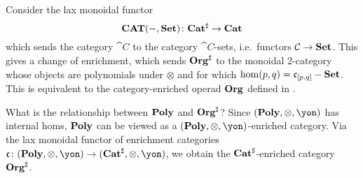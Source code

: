 Consider the lax monoidal functor
\[\mathbf{CAT}(-,\mathbf{Set}) \colon \mathbf{Cat}^\sharp \to \mathbf{Cat}\]
which sends the category $\cat{C}$ to the category $\cat{C}$-sets, i.e.\ functors $\mathcal{C}\to\mathbf{Set}$. This gives a change of enrichment, which sends $\mathbf{Org}^\sharp$ to the monoidal 2-category whose objects are polynomials under $\otimes$ and for which $\hom(p,q)=\mathfrak{c}_{[p,q]}-\mathbf{Set}$. This is equivalent to the category-enriched operad $\mathbf{Org}$ defined in \cite[Definition 2.19]{spivak2021learnersv1}.

\begin{remark}
    What is the relationship between $\mathbf{Poly}$ and $\mathbf{Org}^\sharp$? Since $(\poly, \otimes, \yon)$ has internal homs, $\mathbf{Poly}$ can be viewed as a $(\poly, \otimes, \yon)$-enriched category. Via the lax monoidal functor of enrichment categories $\cofree\colon (\poly, \otimes, \yon) \to (\smcat^\sharp, \otimes, \yon)$, we obtain the $\mathbf{Cat}^\sharp$-enriched category $\mathbf{Org}^\sharp$.
\end{remark}

